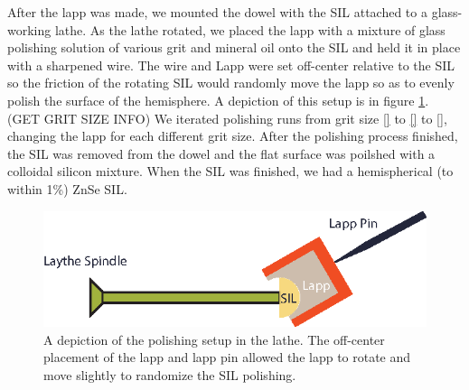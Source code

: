 \indent After the lapp was made, we mounted the dowel with the SIL attached to a glass-working lathe. As the lathe rotated, we placed the lapp with a mixture of glass polishing solution of various grit and mineral oil onto the SIL and held it in place with a sharpened wire. The wire and Lapp were set off-center relative to the SIL so the friction of the rotating SIL would randomly move the lapp so as to evenly polish the surface of the hemisphere. A depiction of this setup is in figure \ref{polish}. (GET GRIT SIZE INFO) We iterated polishing runs from grit size \ref{} to \ref{} to \ref{}, changing the lapp for each different grit size. After the polishing process finished, the SIL was removed from the dowel and the flat surface was poilshed with a colloidal silicon mixture. When the SIL was finished, we had a hemispherical (to within 1\%) ZnSe SIL.

\begin{figure}[h!]
\centering
\includegraphics[width = .8\textwidth]{lathe.eps}
\caption{ \doublespacing A depiction of the polishing setup in the lathe. The off-center placement of the lapp and lapp pin allowed the lapp to rotate and move slightly to randomize the SIL polishing.}
\label{polish}
\end{figure}

